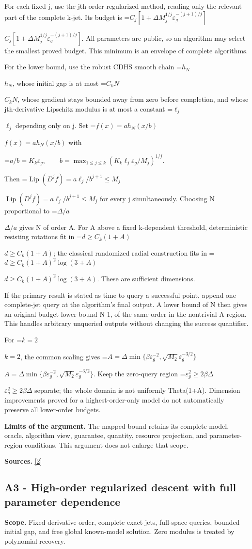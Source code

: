 \documentclass[10pt,a4paper]{article}
\newcommand{\AtlasMath}[1]{\par\begingroup\centering\setbox0=\hbox{$\displaystyle #1$}\ifdim\wd0>1.4\linewidth\typeout{ATLAS WIDE FORMULA: \the\wd0}\fi\ifdim\wd0>\linewidth\resizebox{\linewidth}{!}{\box0}\else\box0\fi\par\endgroup}
\newcommand{\AtlasInlineMath}[1]{\begingroup\setbox0=\hbox{$#1$}\ifdim\wd0>.4\linewidth\endgroup\AtlasMath{#1}\else\endgroup$#1$\fi}
\begin{document}
For each fixed j, use the jth-order regularized method, reading only the relevant part of the complete k-jet. Its budget is \AtlasInlineMath{C_j[1+\Delta M_j^{1/j}\varepsilon_g^{-(j+1)/j}]}. All parameters are public, so an algorithm may select the smallest proved budget. This minimum is an envelope of complete algorithms.

For the lower bound, use the robust CDHS smooth chain \AtlasInlineMath{h_N}, whose initial gap is at most \AtlasInlineMath{C_kN}, whose gradient stays bounded away from zero before completion, and whose jth-derivative Lipschitz modulus is at most a constant \AtlasInlineMath{\ell_j} depending only on j. Set \AtlasInlineMath{f(x)=a h_N(x/b)} with

\AtlasMath{a/b=K_k\varepsilon_g,\qquad
b=\max_{1\le j\le k}(K_k\ell_j\varepsilon_g/M_j)^{1/j}.}

Then \AtlasInlineMath{\operatorname{Lip}(D^jf)=a\ell_j/b^{j+1}\le M_j} for every j simultaneously. Choosing N proportional to \AtlasInlineMath{\Delta/a} gives N of order A. For A above a fixed k-dependent threshold, deterministic resisting rotations fit in \AtlasInlineMath{d\ge C_k(1+A)}; the classical randomized radial construction fits in \AtlasInlineMath{d\ge C_k(1+A)^2\log(3+A)}. These are sufficient dimensions.

If the primary result is stated as time to query a successful point, append one complete-jet query at the algorithm's final output. A lower bound of N then gives an original-budget lower bound N-1, of the same order in the nontrivial A region. This handles arbitrary unqueried outputs without changing the success quantifier.

For \AtlasInlineMath{k=2}, the common scaling gives \AtlasInlineMath{A=\Delta\min\{\beta\varepsilon_g^{-2},\sqrt{M_2}\varepsilon_g^{-3/2}\}}. Keep the zero-query region \AtlasInlineMath{\varepsilon_g^2\ge2\beta\Delta} separate; the whole domain is not uniformly Theta(1+A). Dimension improvements proved for a highest-order-only model do not automatically preserve all lower-order budgets.

\textbf{Limits of the argument.} The mapped bound retains its complete model, oracle, algorithm view, guarantee, quantity, resource projection, and parameter-region conditions. This argument does not enlarge that scope.

\textbf{Sources.} \href{https://arxiv.org/abs/1710.11606v3}{[2]}

\subsection{A3 - High-order regularized descent with full parameter dependence}
\textbf{Scope.} Fixed derivative order, complete exact jets, full-space queries, bounded initial gap, and free global known-model solution. Zero modulus is treated by polynomial recovery.
\end{document}
